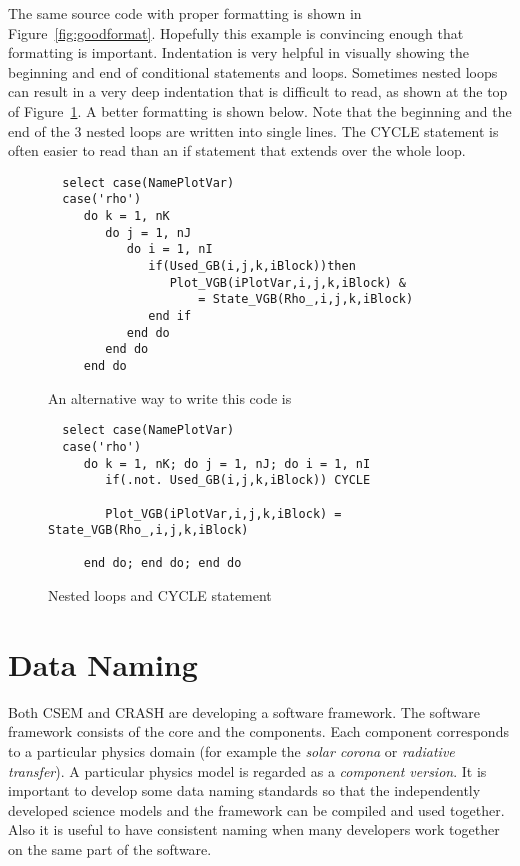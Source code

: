 \documentclass{article}
\begin{document}
The same source code with proper formatting is shown in 
Figure~\ref{fig:goodformat}.
Hopefully this example is convincing enough that formatting is important.
Indentation is very helpful in visually showing the beginning and end of
conditional statements and loops. Sometimes nested loops can result in 
a very deep indentation that is difficult to read, as shown at the
top of Figure~\ref{fig:nested}. A better formatting is shown below.
Note that the beginning and the end of the 3 nested loops are written into
single lines. The CYCLE statement is often easier to read than an if statement
that extends over the whole loop. 

\begin{figure}
\begin{verbatim}
  select case(NamePlotVar)
  case('rho')
     do k = 1, nK
        do j = 1, nJ
           do i = 1, nI
              if(Used_GB(i,j,k,iBlock))then
                 Plot_VGB(iPlotVar,i,j,k,iBlock) &
                     = State_VGB(Rho_,i,j,k,iBlock)
              end if
           end do
        end do
     end do
\end{verbatim}
An alternative way to write this code is
\begin{verbatim}
  select case(NamePlotVar)
  case('rho')
     do k = 1, nK; do j = 1, nJ; do i = 1, nI
        if(.not. Used_GB(i,j,k,iBlock)) CYCLE

        Plot_VGB(iPlotVar,i,j,k,iBlock) = State_VGB(Rho_,i,j,k,iBlock)

     end do; end do; end do
\end{verbatim}
\caption{Nested loops and CYCLE statement}
\label{fig:nested}
\end{figure}


\section{Data Naming}

Both CSEM and CRASH are developing a software framework.
The software framework consists of the core and the components.
Each component corresponds to a particular physics domain 
(for example the {\it solar corona} or {\it radiative transfer}). 
A particular physics model is regarded as a {\it component version}.
It is important to develop some data naming
standards so that the independently developed science models 
and the framework can be compiled and used together. Also it is useful
to have consistent naming when many developers work together
on the same part of the software.
\end{document}

